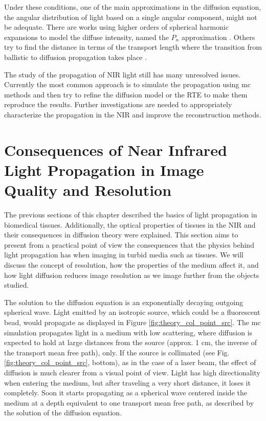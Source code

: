 Under these conditions, one of the main approximations in the diffusion equation, the angular distribution of light based on a single angular component, might not be adequate. There are works using higher orders of spherical harmonic expansions to model the diffuse intensity, named the $P_n$ approximation \cite{Arridge2009}. Others try to find the distance in terms of the transport length where the transition from ballistic to diffusion propagation takes place \cite{Yaroshevsky2011}.

The study of the propagation of NIR light still has many unresolved issues. Currently the most common approach is to simulate the propagation using \gls{mc} methods\cite{WangJacquesZheng1995} and then try to refine the diffusion model \cite{Ripoll2005,Durduran1997,Spott2000} or the RTE \cite{tarvainen2005} to make them reproduce the results. Further investigations are needed to appropriately characterize the propagation in the NIR and improve the reconstruction methods. 

\section{Consequences of Near Infrared Light Propagation in Image Quality and Resolution}
\label{sec:resolution}
The previous sections of this chapter described the basics of light propagation in biomedical tissues. Additionally, the optical properties of tissues in the NIR and their consequences in diffusion theory were explained. This section aims to present from a practical point of view the consequences that the physics behind light propagation has when imaging in turbid media such as tissues. We will discuss the concept of resolution, how the properties of the medium affect it, and how light diffusion reduces image resolution as we image further from the objects studied.

The solution to the diffusion equation is an exponentially decaying outgoing spherical wave. Light emitted by an isotropic source, which could be a fluorescent bead, would propagate as displayed in Figure \ref{fig:theory_col_point_src}. The \gls{mc} simulation propagates light in a medium with low scattering, where diffusion is expected to hold at large distances from the source (approx. 1 cm, the inverse of the transport mean free path), only. If the source is collimated (see Fig.\ref{fig:theory_col_point_src}, bottom), as in the case of a laser beam, the effect of diffusion is much clearer from a visual point of view. Light has high directionality when entering the medium, but after traveling a very short distance, it loses it completely. Soon it starts propagating as a spherical wave centered inside the medium at a depth equivalent to one transport mean free path, as described by the solution of the diffusion equation.

